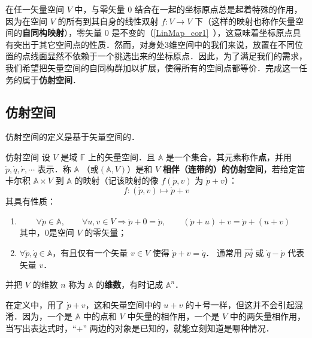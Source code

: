 

在任一矢量空间 $V$ 中，与零矢量 $0$ 结合在一起的坐标原点总是起着特殊的作用，因为在空间 $V$ 的所有到其自身的线性双射 $f:V\rightarrow V$ 下（这样的映射也称作矢量空间的\textbf{自同构映射}），零矢量 $0$ 是不变的（\autoref{LinMap_cor1}~），这意味着坐标原点具有突出于其它空间点的性质．然而，对身处3维空间中的我们来说，放置在不同位置的点线面显然不依赖于一个挑选出来的坐标原点．因此，为了满足我们的需求，我们希望把矢量空间的自同构群加以扩展，使得所有的空间点都等价．完成这一任务的属于\textbf{仿射空间}．
\subsection{仿射空间}\label{AfSp_sub1}
仿射空间的定义是基于矢量空间的．
\begin{definition}{仿射空间}\label{AfSp_def1}
设 $V$ 是域 $\mathbb F$ 上的矢量空间．且 $\mathbb A$ 是一个集合，其元素称作\textbf{点}，并用 $\dot{p},\dot{q},\dot{r},\cdots$ 表示．称 $\mathbb A$ （或$(\mathbb A,V)$）是和 $V$ \textbf{相伴（连带的）的仿射空间}，若给定笛卡尔积 $\mathbb A\times V$ 到 $\mathbb A$ 的映射（记该映射的像 $f(\dot p,v)$ 为 $\dot p+v$）：
\begin{equation}
f:(\dot p,v)\mapsto\dot p+v
\end{equation}
其具有性质：
\begin{enumerate}
\item \begin{equation}
\forall \dot p\in\mathbb A,\qquad
\forall u,v\in V\Rightarrow\dot p+0=\dot p, \qquad
(\dot p+u)+v=\dot p+(u+v)
\end{equation}
其中，0是空间 $V$ 的零矢量；
\item $\forall \dot p,\dot q\in\mathbb A$，有且仅有一个矢量 $v\in V$ 使得 $\dot p+v=\dot q$． 通常用 $\overrightarrow{pq}$ 或 $\dot q-\dot p$ 代表矢量 $v$．
\end{enumerate}
并把 $V$ 的维数 $n$ 称为 $\mathbb A$ 的\textbf{维数}，有时记成 $\mathbb A^n$．
\end{definition}
在定义中，用了 $\dot p+v$，这和矢量空间中的 $u+v$ 的＋号一样，但这并不会引起混淆．因为，一个是 $\mathbb A$ 中的点和 $V$ 中矢量的相作用，一个是 $V$ 中的两矢量相作用，当写出表达式时，“+” 两边的对象是已知的，就能立刻知道是哪种情况．

